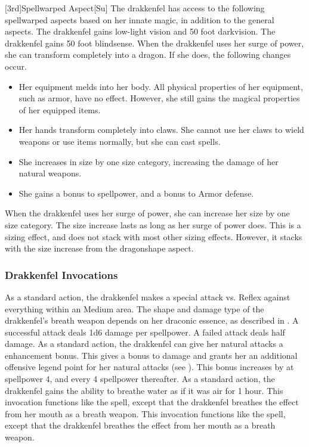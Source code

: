 [3rd]{Spellwarped Aspect}[Su]
The drakkenfel has access to the following spellwarped aspects based on her innate magic, in addition to the general aspects.
The drakkenfel gains low-light vision and 50 foot darkvision.
The drakkenfel gains 50 foot blindsense.
When the drakkenfel uses her surge of power, she can transform completely into a dragon.
If she does, the following changes occur.
\begin{itemize}
    \item Her equipment melds into her body. All physical properties of her equipment, such as armor, have no effect. However, she still gains the magical properties of her equipped items.
    \item Her hands transform completely into claws. She cannot use her claws to wield weapons or use items normally, but she can cast spells.
    \item She increases in size by one size category, increasing the damage of her natural weapons.
    \item She gains a  bonus to spellpower, and a  bonus to Armor defense.
\end{itemize}
When the drakkenfel uses her surge of power, she can increase her size by one size category.
The size increase lasts as long as her surge of power does.
This is a sizing effect, and does not stack with most other sizing effects.
However, it stacks with the size increase from the dragonshape aspect.

\subsubsection{Drakkenfel Invocations}
As a standard action, the drakkenfel makes a special attack vs. Reflex against everything within an Medium area.
The shape and damage type of the drakkenfel's breath weapon depends on her draconic essence, as described in .
A successful attack deals 1d6 damage per spellpower.
A failed attack deals half damage.
As a standard action, the drakkenfel can give her natural attacks a  enhancement bonus.
This gives a  bonus to damage and grants her an additional offensive legend point for her natural attacks (see ).
This bonus increases by  at spellpower 4, and every 4 spellpower thereafter.
As a standard action, the drakkenfel gains the ability to breathe water as if it was air for 1 hour.
This invocation functions like the  spell, except that the drakkenfel breathes the effect from her mouth as a breath weapon.
This invocation functions like the  spell, except that the drakkenfel breathes the effect from her mouth as a breath weapon.

